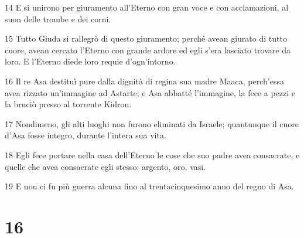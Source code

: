 \par 14 E si unirono per giuramento all'Eterno con gran voce e con acclamazioni, al suon delle trombe e dei corni.
\par 15 Tutto Giuda si rallegrò di questo giuramento; perché avean giurato di tutto cuore, avean cercato l'Eterno con grande ardore ed egli s'era lasciato trovare da loro. E l'Eterno diede loro requie d'ogn'intorno.
\par 16 Il re Asa destituì pure dalla dignità di regina sua madre Maaca, perch'essa avea rizzato un'immagine ad Astarte; e Asa abbatté l'immagine, la fece a pezzi e la bruciò presso al torrente Kidron.
\par 17 Nondimeno, gli alti luoghi non furono eliminati da Israele; quantunque il cuore d'Asa fosse integro, durante l'intera sua vita.
\par 18 Egli fece portare nella casa dell'Eterno le cose che suo padre avea consacrate, e quelle che avea consacrate egli stesso: argento, oro, vasi.
\par 19 E non ci fu più guerra alcuna fino al trentacinquesimo anno del regno di Asa.

\chapter{16}

